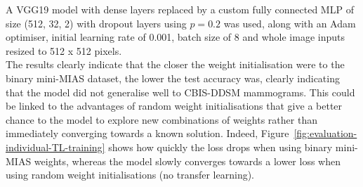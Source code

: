A VGG19 model with dense layers replaced by a custom fully connected MLP of size (512, 32, 2) with dropout layers using $p=0.2$ was used, along with an Adam optimiser, initial learning rate of 0.001, batch size of 8 and whole image inputs resized to 512 x 512 pixels.\\

The results clearly indicate that the closer the weight initialisation were to the binary mini-MIAS dataset, the lower the test accuracy was, clearly indicating that the model did not generalise well to CBIS-DDSM mammograms. This could be linked to the advantages of random weight initialisations that give a better chance to the model to explore new combinations of weights rather than immediately converging towards a known solution. Indeed, Figure~\ref{fig:evaluation-individual-TL-training} shows how quickly the loss drops when using binary mini-MIAS weights, whereas the model slowly converges towards a lower loss when using random weight initialisations (no transfer learning).

